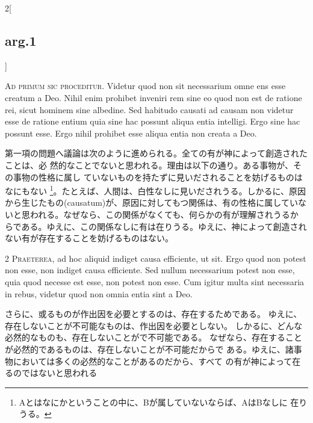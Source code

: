 \documentclass[paper=a4paper,fontsize=10pt,jafontsize=9pt,titlepage]{jlreq}
\begin{document}
\begin{paracol}{2}[\subsection{arg.1}]

{\scshape Ad primum sic proceditur}. Videtur quod non sit necessarium omne ens esse
 creatum a Deo. Nihil enim prohibet inveniri rem sine eo quod non est de
 ratione rei, sicut hominem sine albedine. Sed habitudo causati ad
 causam non videtur esse de ratione entium quia sine hac possunt aliqua
 entia intelligi. Ergo sine hac possunt esse. Ergo nihil prohibet esse
 aliqua entia non creata a Deo.

\switchcolumn

第一項の問題へ議論は次のように進められる。全ての有が神によって創造されたことは、必
 然的なことでないと思われる。理由は以下の通り。ある事物が、その事物の性格に属し
 ていないものを持たずに見いだされることを妨げるものはなにもない
 \footnote{Aとはなにかということの中に、Bが属していないならば、AはBなしに
 在りうる。}。たとえば、人間は、白性なしに見いだされうる。しかるに、原因
 から生じたもの(causatum)が、原因に対してもつ関係は、有の性格に属していな
 いと思われる。なぜなら、この関係がなくても、何らかの有が理解されうるか
 らである。ゆえに、この関係なしに有は在りうる。ゆえに、神によって創造され
 ない有が存在することを妨げるものはない。


2 {\scshape Praeterea}, ad hoc aliquid indiget causa efficiente, ut sit. Ergo
 quod non potest non esse, non indiget causa efficiente. Sed nullum
 necessarium potest non esse, quia quod necesse est esse, non potest non
 esse. Cum igitur multa sint necessaria in rebus, videtur quod non omnia
 entia sint a Deo.

\switchcolumn

さらに、或るものが作出因を必要とするのは、存在するためである。
ゆえに、存在しないことが不可能なものは、作出因を必要としない。
しかるに、どんな必然的なものも、存在しないことがで不可能である。
なぜなら、存在することが必然的であるものは、存在しないことが不可能だからで
 ある。ゆえに、諸事物においては多くの必然的なことがあるのだから、すべて
 の有が神によって在るのではないと思われる



\end{paracol}
\end{document}
